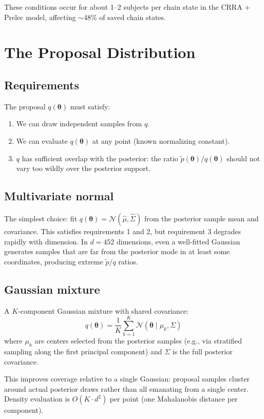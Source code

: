\documentclass[11pt]{article}
\newcommand{\bth}{\boldsymbol{\theta}}
\newcommand{\ptilde}{\tilde{p}}
\theoremstyle{plain}
\theoremstyle{definition}
\begin{document}
These conditions occur for about 1--2 subjects per chain state in the
CRRA + Prelec model, affecting $\sim$48\% of saved chain states.


\section{The Proposal Distribution}

\subsection{Requirements}

The proposal $q(\bth)$ must satisfy:
\begin{enumerate}
  \item We can draw independent samples from $q$.
  \item We can evaluate $q(\bth)$ at any point (known normalizing constant).
  \item $q$ has sufficient overlap with the posterior: the ratio
    $\ptilde(\bth) / q(\bth)$ should not vary too wildly over the posterior
    support.
\end{enumerate}

\subsection{Multivariate normal}

The simplest choice: fit $q(\bth) = \mathcal{N}(\hat{\mu}, \hat{\Sigma})$
from the posterior sample mean and covariance. This satisfies requirements 1
and 2, but requirement 3 degrades rapidly with dimension. In $d = 452$
dimensions, even a well-fitted Gaussian generates samples that are far from
the posterior mode in at least some coordinates, producing extreme
$\ptilde / q$ ratios.

\subsection{Gaussian mixture}

A $K$-component Gaussian mixture with shared covariance:
\begin{equation}
  q(\bth) = \frac{1}{K} \sum_{k=1}^{K} \mathcal{N}(\bth \mid \mu_k, \Sigma)
\end{equation}
where $\mu_k$ are centers selected from the posterior samples (e.g., via
stratified sampling along the first principal component) and $\Sigma$ is the
full posterior covariance.

This improves coverage relative to a single Gaussian: proposal samples
cluster around actual posterior draws rather than all emanating from a single
center. Density evaluation is $O(K \cdot d^2)$ per point (one Mahalanobis
distance per component).
\end{document}
